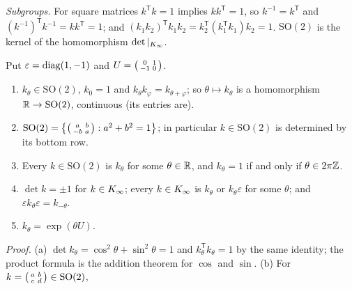 \begin{definition}[$\Kinf=\Ort(2)$]
\end{definition}
\noindent\emph{Subgroups.} For square matrices $k^{\mathsf T}k=1$ implies $kk^{\mathsf T}=1$, so $k^{-1}=k^{\mathsf T}$ and
$(k^{-1})^{\mathsf T}k^{-1}=kk^{\mathsf T}=1$; and $(k_1k_2)^{\mathsf T}k_1k_2=k_2^{\mathsf T}(k_1^{\mathsf T}k_1)k_2=1$. $\mathrm{SO}(2)$ is the
kernel of the homomorphism $\det|_{K_\infty}$.

\begin{definition}[rotations]
\end{definition}

\begin{remark}\label{rem:rotation}
Put $\varepsilon=\operatorname{diag}(1,-1)$ and $U=\begin{psmallmatrix}0&1\\-1&0\end{psmallmatrix}$.
\begin{enumerate}[label=(\alph*)]
\item\label{rot-hom} $k_\theta\in\mathrm{SO}(2)$, $k_0=1$ and $k_\theta k_\varphi=k_{\theta+\varphi}$; so $\theta\mapsto k_\theta$ is a
  homomorphism $\mathbb{R}\to\mathrm{SO}(2)$, continuous (its entries are).
\item\label{rot-shape} $\mathrm{SO}(2)=\bigl\{\begin{psmallmatrix}a&b\\-b&a\end{psmallmatrix}:a^2+b^2=1\bigr\}$; in particular $k\in\mathrm{SO}(2)$ is
  determined by its bottom row.
\item\label{rot-surj} Every $k\in\mathrm{SO}(2)$ is $k_\theta$ for some $\theta\in\mathbb{R}$, and $k_\theta=1$ if and only if $\theta\in2\pi\mathbb{Z}$.
\item\label{rot-o2} $\det k=\pm1$ for $k\in K_\infty$; every $k\in K_\infty$ is $k_\theta$ or $k_\theta\varepsilon$ for some $\theta$;
  and $\varepsilon k_\theta\varepsilon=k_{-\theta}$.
\item\label{rot-exp} $k_\theta=\exp(\theta U)$.
\end{enumerate}
\emph{Proof.} (a) $\det k_\theta=\cos^2\theta+\sin^2\theta=1$ and $k_\theta^{\mathsf T}k_\theta=1$ by the same identity;
the product formula is the addition theorem for $\cos$ and $\sin$. (b) For $k=\begin{psmallmatrix}a&b\\c&d\end{psmallmatrix}\in\mathrm{SO}(2)$,

\end{remark}
